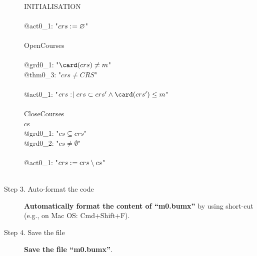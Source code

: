 \begin{description}
\begin{center}
\begin{Bcode}
      \Bevents\\
      \Btab INITIALISATION\\
      \Btab \Bbegin \\
      \Btab\Btab @act0\_1: "\(crs \mathrel{:\mkern1mu=} \mathord\varnothing\)"\\
      \Btab \Bend\\
      \Btab OpenCourses\\
      \Btab \Bwhen\\
      \Btab \Btab @grd0\_1: "\(\card(crs) \neq m\)" \\
      \Btab \Btab @thm0\_3: "\(crs \neq CRS\)" \Btheorem \\
      \Btab \Bthen\\
      \Btab \Btab @act0\_1: "\(crs \bcmsuch crs \subset crs' \land \card(crs') \leq m\)"\\
      \Btab \Bend\\
      \Btab CloseCourses \Banticipated\\
      \Btab \Bany{} cs \Bwhere\\
      \Btab \Btab @grd0\_1: "\(cs \subseteq crs\)"\\
      \Btab \Btab @grd0\_2: "\(cs \neq \emptyset\)"\\
      \Btab \Bthen\\
      \Btab \Btab @act0\_1: "\(crs \mathrel{:\mkern1mu=} crs \setminus cs\)"\\
      \Btab \Bend\\
      \Bend
      \fi
    \end{Bcode}
  \end{center}
\item[Step 3. Auto-format the code] \textbf{Automatically format the content of ``m0.bumx''} by using short-cut (e.g., on Mac OS: Cmd+Shift+F).

\item[Step 4. Save the file] \textbf{Save the file ``m0.bumx''}.


\end{description}
